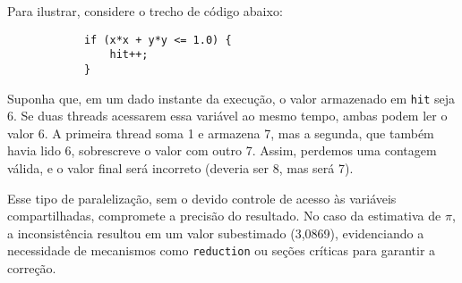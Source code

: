\documentclass[a4paper, 12pt]{article}
\begin{document}
	\hspace{0.7cm}Para ilustrar, considere o trecho de código abaixo:
	
	\begin{center}
		\lstset{basicstyle=\ttfamily}
		\begin{lstlisting}
			if (x*x + y*y <= 1.0) {
				hit++;
			}
		\end{lstlisting}
	\end{center}
	
	\hspace{0.7cm}Suponha que, em um dado instante da execução, o valor armazenado em \texttt{hit} seja 6. Se duas threads acessarem essa variável ao mesmo tempo, ambas podem ler o valor 6. A primeira thread soma 1 e armazena 7, mas a segunda, que também havia lido 6, sobrescreve o valor com outro 7. Assim, perdemos uma contagem válida, e o valor final será incorreto (deveria ser 8, mas será 7).
	
	\hspace{0.7cm}Esse tipo de paralelização, sem o devido controle de acesso às variáveis compartilhadas, compromete a precisão do resultado. No caso da estimativa de $\pi$, a inconsistência resultou em um valor subestimado (3{,}0869), evidenciando a necessidade de mecanismos como \texttt{reduction} ou seções críticas para garantir a correção.
	
	
	
	 
	
\end{document}

